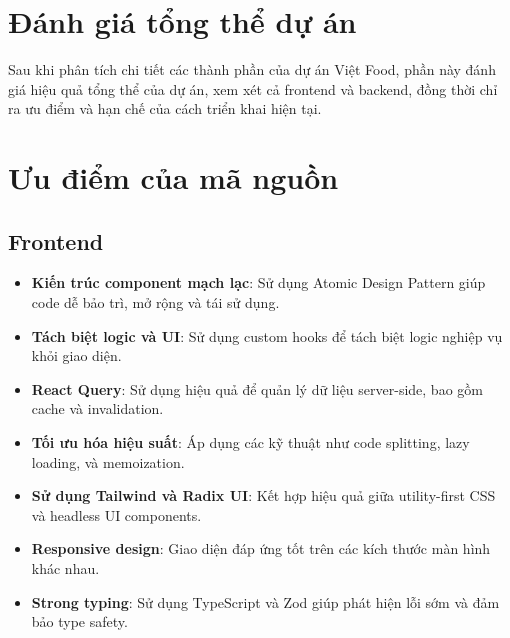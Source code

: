 \section{Đánh giá tổng thể dự án}

Sau khi phân tích chi tiết các thành phần của dự án Việt Food, phần này đánh giá hiệu quả tổng thể của dự án, xem xét cả frontend và backend, đồng thời chỉ ra ưu điểm và hạn chế của cách triển khai hiện tại.

\section{Ưu điểm của mã nguồn}

\subsection{Frontend}
\begin{itemize}
    \item \textbf{Kiến trúc component mạch lạc}: Sử dụng Atomic Design Pattern giúp code dễ bảo trì, mở rộng và tái sử dụng.
    \item \textbf{Tách biệt logic và UI}: Sử dụng custom hooks để tách biệt logic nghiệp vụ khỏi giao diện.
    \item \textbf{React Query}: Sử dụng hiệu quả để quản lý dữ liệu server-side, bao gồm cache và invalidation.
    \item \textbf{Tối ưu hóa hiệu suất}: Áp dụng các kỹ thuật như code splitting, lazy loading, và memoization.
    \item \textbf{Sử dụng Tailwind và Radix UI}: Kết hợp hiệu quả giữa utility-first CSS và headless UI components.
    \item \textbf{Responsive design}: Giao diện đáp ứng tốt trên các kích thước màn hình khác nhau.
    \item \textbf{Strong typing}: Sử dụng TypeScript và Zod giúp phát hiện lỗi sớm và đảm bảo type safety.
\end{itemize}

